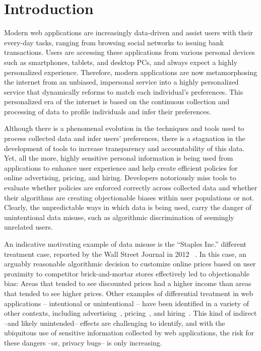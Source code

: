 
\section{Introduction}

Modern web applications are increasingly data-driven and assist users
with their every-day tasks, ranging from browsing social networks to
issuing bank transactions. Users are accessing these applications from
various personal devices such as smartphones, tablets, and desktop PCs,
and always expect a highly personalized experience. Therefore, modern
applications are now metamorphosing the internet from an unbiased, impersonal
service into a highly personalized service that dynamically reforms to match
each individual's preferences. This personalized era of the internet
is based on the continuous collection and processing of data to profile individuals
and infer their preferences.

Although there is a phenomenal evolution in the techniques and tools used to
process collected data and infer users' preferences, there is a stagnation
in the development of tools to increase transparency and accountability of
this data. Yet, all the more,  highly sensitive personal information is being
used from applications to enhance user experience and help create efficient
policies for online advertising, pricing, and hiring.
Developers notoriously miss tools to evaluate whether policies are
enforced correctly across collected data and whether their algorithms are
creating objectionable biases within user populations or not. Clearly,
the unpredictable ways in which data is being used, carry the danger of
unintentional data misuse, such as algorithmic discrimination of seemingly
unrelated users.

An indicative motivating example of data misuse is the ``Staples Inc.''
different treatment case, reported by the Wall Street Journal in 2012
~\cite{Staples}. In this case, an arguably reasonable algorithmic decision
to customize online prices based on user proximity to competitor
brick-and-mortar stores effectively led to objectionable bias:
Areas that tended to see discounted prices had a higher income than areas
that tended to see higher prices. Other examples of differential treatment in
web applications – intentional or unintentional – have been identified in a
variety of other contexts, including
advertising~\cite{Sweeney:AdDiscrimination},
pricing~\cite{Hannak:PriceDiscrimination}, and
hiring~\cite{acquisiti:HiringDiscrimination}. This kind of indirect --and likely
unintended-- effects are challenging to identify, and with the ubiquitous use
of sensitive information collected by web applications, the risk for these
dangers --or, privacy bugs-- is only increasing.

